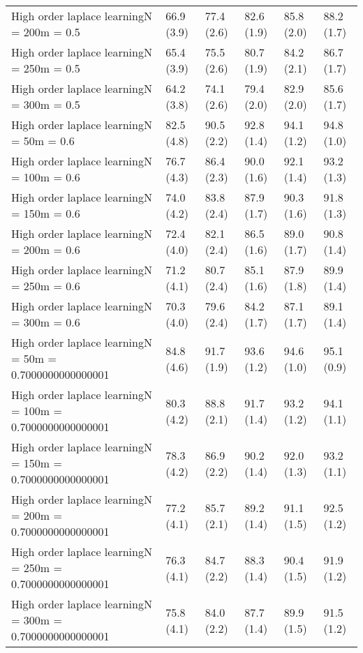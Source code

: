 \documentclass{article}
\begin{document}
\begin{table*}[t!]
\begin{center}
\begin{small}
\begin{sc}
\begin{tabular}{llllll}
High order laplace learningN = 200m = 0.5&66.9 (3.9)      &77.4 (2.6)      &82.6 (1.9)      &85.8 (2.0)      &88.2 (1.7)      \\
High order laplace learningN = 250m = 0.5&65.4 (3.9)      &75.5 (2.6)      &80.7 (1.9)      &84.2 (2.1)      &86.7 (1.7)      \\
High order laplace learningN = 300m = 0.5&64.2 (3.8)      &74.1 (2.6)      &79.4 (2.0)      &82.9 (2.0)      &85.6 (1.7)      \\
High order laplace learningN = 50m = 0.6&82.5 (4.8)      &90.5 (2.2)      &92.8 (1.4)      &94.1 (1.2)      &94.8 (1.0)      \\
High order laplace learningN = 100m = 0.6&76.7 (4.3)      &86.4 (2.3)      &90.0 (1.6)      &92.1 (1.4)      &93.2 (1.3)      \\
High order laplace learningN = 150m = 0.6&74.0 (4.2)      &83.8 (2.4)      &87.9 (1.7)      &90.3 (1.6)      &91.8 (1.3)      \\
High order laplace learningN = 200m = 0.6&72.4 (4.0)      &82.1 (2.4)      &86.5 (1.6)      &89.0 (1.7)      &90.8 (1.4)      \\
High order laplace learningN = 250m = 0.6&71.2 (4.1)      &80.7 (2.4)      &85.1 (1.6)      &87.9 (1.8)      &89.9 (1.4)      \\
High order laplace learningN = 300m = 0.6&70.3 (4.0)      &79.6 (2.4)      &84.2 (1.7)      &87.1 (1.7)      &89.1 (1.4)      \\
High order laplace learningN = 50m = 0.7000000000000001&84.8 (4.6)      &91.7 (1.9)      &93.6 (1.2)      &94.6 (1.0)      &95.1 (0.9)      \\
High order laplace learningN = 100m = 0.7000000000000001&80.3 (4.2)      &88.8 (2.1)      &91.7 (1.4)      &93.2 (1.2)      &94.1 (1.1)      \\
High order laplace learningN = 150m = 0.7000000000000001&78.3 (4.2)      &86.9 (2.2)      &90.2 (1.4)      &92.0 (1.3)      &93.2 (1.1)      \\
High order laplace learningN = 200m = 0.7000000000000001&77.2 (4.1)      &85.7 (2.1)      &89.2 (1.4)      &91.1 (1.5)      &92.5 (1.2)      \\
High order laplace learningN = 250m = 0.7000000000000001&76.3 (4.1)      &84.7 (2.2)      &88.3 (1.4)      &90.4 (1.5)      &91.9 (1.2)      \\
High order laplace learningN = 300m = 0.7000000000000001&75.8 (4.1)      &84.0 (2.2)      &87.7 (1.4)      &89.9 (1.5)      &91.5 (1.2)      \\

\end{tabular}
\end{sc}
\end{small}
\end{center}
\end{table*}
\end{document}
